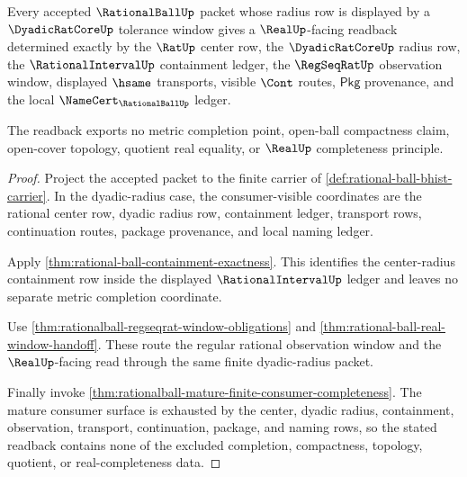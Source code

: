 \begin{theorem}
\label{thm:rationalball-dyadic-radius-readback}
Every accepted $\RationalBallUp$ packet whose radius row is displayed by a
$\DyadicRatCoreUp$ tolerance window gives a $\RealUp$-facing readback
determined exactly by the $\RatUp$ center row, the $\DyadicRatCoreUp$ radius
row, the $\RationalIntervalUp$ containment ledger, the $\RegSeqRatUp$
observation window, displayed $\hsame$ transports, visible $\Cont$ routes,
$\mathsf{Pkg}$ provenance, and the local
$\NameCert_{\RationalBallUp}$ ledger.

The readback exports no metric completion point, open-ball compactness claim,
open-cover topology, quotient real equality, or $\RealUp$ completeness
principle.
\end{theorem}
\begin{proof}
Project the accepted packet to the finite carrier of
\autoref{def:rational-ball-bhist-carrier}. In the dyadic-radius case, the
consumer-visible coordinates are the rational center row, dyadic radius row,
containment ledger, transport rows, continuation routes, package provenance,
and local naming ledger.

Apply \autoref{thm:rational-ball-containment-exactness}. This identifies the
center-radius containment row inside the displayed
$\RationalIntervalUp$ ledger and leaves no separate metric completion
coordinate.

Use \autoref{thm:rationalball-regseqrat-window-obligations} and
\autoref{thm:rational-ball-real-window-handoff}. These route the regular
rational observation window and the $\RealUp$-facing read through the same
finite dyadic-radius packet.

Finally invoke
\autoref{thm:rationalball-mature-finite-consumer-completeness}. The mature
consumer surface is exhausted by the center, dyadic radius, containment,
observation, transport, continuation, package, and naming rows, so the stated
readback contains none of the excluded completion, compactness, topology,
quotient, or real-completeness data.
\end{proof}

